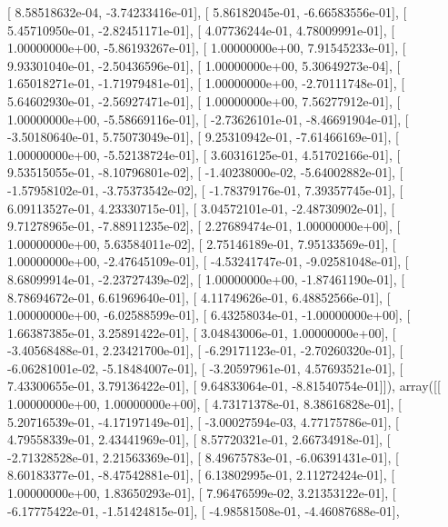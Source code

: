 \documentclass{article}
\begin{document}
       [  8.58518632e-04,  -3.74233416e-01],
       [  5.86182045e-01,  -6.66583556e-01],
       [  5.45710950e-01,  -2.82451171e-01],
       [  4.07736244e-01,   4.78009991e-01],
       [  1.00000000e+00,  -5.86193267e-01],
       [  1.00000000e+00,   7.91545233e-01],
       [  9.93301040e-01,  -2.50436596e-01],
       [  1.00000000e+00,   5.30649273e-04],
       [  1.65018271e-01,  -1.71979481e-01],
       [  1.00000000e+00,  -2.70111748e-01],
       [  5.64602930e-01,  -2.56927471e-01],
       [  1.00000000e+00,   7.56277912e-01],
       [  1.00000000e+00,  -5.58669116e-01],
       [ -2.73626101e-01,  -8.46691904e-01],
       [ -3.50180640e-01,   5.75073049e-01],
       [  9.25310942e-01,  -7.61466169e-01],
       [  1.00000000e+00,  -5.52138724e-01],
       [  3.60316125e-01,   4.51702166e-01],
       [  9.53515055e-01,  -8.10796801e-02],
       [ -1.40238000e-02,  -5.64002882e-01],
       [ -1.57958102e-01,  -3.75373542e-02],
       [ -1.78379176e-01,   7.39357745e-01],
       [  6.09113527e-01,   4.23330715e-01],
       [  3.04572101e-01,  -2.48730902e-01],
       [  9.71278965e-01,  -7.88911235e-02],
       [  2.27689474e-01,   1.00000000e+00],
       [  1.00000000e+00,   5.63584011e-02],
       [  2.75146189e-01,   7.95133569e-01],
       [  1.00000000e+00,  -2.47645109e-01],
       [ -4.53241747e-01,  -9.02581048e-01],
       [  8.68099914e-01,  -2.23727439e-02],
       [  1.00000000e+00,  -1.87461190e-01],
       [  8.78694672e-01,   6.61969640e-01],
       [  4.11749626e-01,   6.48852566e-01],
       [  1.00000000e+00,  -6.02588599e-01],
       [  6.43258034e-01,  -1.00000000e+00],
       [  1.66387385e-01,   3.25891422e-01],
       [  3.04843006e-01,   1.00000000e+00],
       [ -3.40568488e-01,   2.23421700e-01],
       [ -6.29171123e-01,  -2.70260320e-01],
       [ -6.06281001e-02,  -5.18484007e-01],
       [ -3.20597961e-01,   4.57693521e-01],
       [  7.43300655e-01,   3.79136422e-01],
       [  9.64833064e-01,  -8.81540754e-01]]), array([[  1.00000000e+00,   1.00000000e+00],
       [  4.73171378e-01,   8.38616828e-01],
       [  5.20716539e-01,  -4.17197149e-01],
       [ -3.00027594e-03,   4.77175786e-01],
       [  4.79558339e-01,   2.43441969e-01],
       [  8.57720321e-01,   2.66734918e-01],
       [ -2.71328528e-01,   2.21563369e-01],
       [  8.49675783e-01,  -6.06391431e-01],
       [  8.60183377e-01,  -8.47542881e-01],
       [  6.13802995e-01,   2.11272424e-01],
       [  1.00000000e+00,   1.83650293e-01],
       [  7.96476599e-02,   3.21353122e-01],
       [ -6.17775422e-01,  -1.51424815e-01],
       [ -4.98581508e-01,  -4.46087688e-01],
\end{document}
